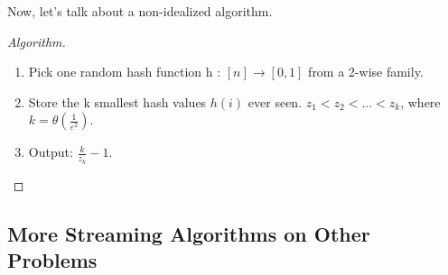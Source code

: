 \documentclass[11pt]{article}
\newcommand{\eps}{\epsilon}
\renewcommand{\epsilon}{\varepsilon}
\newcommand{\<}{\langle}
\renewcommand{\>}{\rangle}
\theoremstyle{definition}
\numberwithin{problem}{section}
\begin{document}
    Now, let's talk about a non-idealized algorithm. \cite{non-idealized}
    \begin{proof}[Algorithm]
    \begin{enumerate}
    	\item Pick one random hash function h : $[n] \rightarrow [0, 1]$ from a 2-wise family.
        \item Store the k smallest hash values $h(i)$ ever seen. $z_1 < z_2 < ... < z_k$, where $k = \theta(\frac{1}{\eps^2})$.
        \item Output: $\frac{k}{z_k} - 1$.
    \end{enumerate} 
    
    \end{proof}
    \subsection{More Streaming Algorithms on Other Problems}
\end{document}
